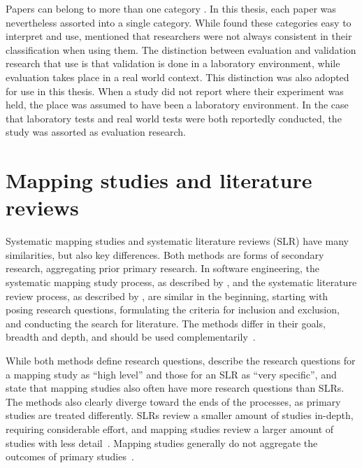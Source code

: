 \documentclass[utf8,english]{gradu3}
\begin{document}
Papers can belong to more than one category \parencite{wieringa2006requirements}.
In this thesis, each paper was nevertheless assorted into a single category.
While \textcite{petersen2008} found these categories easy to interpret and use,
\textcite{petersen2015guidelines} mentioned that researchers were not always consistent
in their classification when using them. The distinction between evaluation and validation research
that \textcite{petersen2015guidelines} use is that validation is done in a laboratory environment,
while evaluation takes place in a real world context.
This distinction was also adopted for use in this thesis.
When a study did not report where their experiment was held,
the place was assumed to have been a laboratory environment.
In the case that laboratory tests and real world tests were both reportedly conducted,
the study was assorted as evaluation research.


\section{Mapping studies and literature reviews}

Systematic mapping studies and systematic literature reviews (SLR) have many similarities, but also key differences.
Both methods are forms of secondary research, aggregating prior primary research.
In software engineering, the systematic mapping study process, as described by \textcite{petersen2008},
and the systematic literature review process, as described by \textcite{kitchenham2009},
are similar in the beginning, starting with posing research questions,
formulating the criteria for inclusion and exclusion, and conducting the search for literature.
The methods differ in their goals, breadth and depth, and should be used complementarily~\parencite{petersen2008}.

While both methods define research questions, \textcite{kitchenham2011} describe the research questions
for a mapping study as ``high level'' and those for an SLR as ``very specific'', and state that
mapping studies also often have more research questions than SLRs.
The methods also clearly diverge toward the ends of the processes, as primary studies are treated differently.
SLRs review a smaller amount of studies in-depth, requiring considerable effort,
and mapping studies review a larger amount of studies with less detail~\parencite{petersen2008}.
Mapping studies generally do not aggregate the outcomes of primary studies~\parencite{kitchenham2011}.
\end{document}
